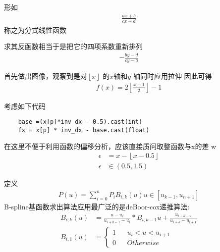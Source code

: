 \begin{thm}[分式线性函数]
形如
\begin{align}
		\frac{ax+b}{cx+d} 
\end{align}
称之为分式线性函数
\par 求其反函数相当于是把它的四项系数重新排列
\begin{align}
	-	\frac{by-d}{cy-a} 
\end{align}
\end{thm}
\begin{thm}
\end{thm}
\begin{thm}[求$x$左边最近的奇数]
首先做出图像，观察到是对$ \left\lfloor x \right\rfloor $ 的$x$轴和$ y $ 轴同时应用拉伸
因此可得
\begin{align*}
		f(x) = 2\left\lfloor \frac{x+1}{2}  \right\rfloor -1
\end{align*}
\end{thm}
\begin{thm}[取整函数分析]
	考虑如下代码	
	\begin{lstlisting}
	base =(x[p]*inv_dx - 0.5).cast(int)
	fx = x[p] * inv_dx - base.cast(float)
	\end{lstlisting}
	在这里不便于利用函数的偏移分析，应该直接质问取整函数与x的差 
	w\begin{align*}
			\epsilon  &= x- \left\lfloor x-0.5\right\rfloor \\
			\epsilon &\in \left( 0.5,1.5 \right) 
	\end{align*}	
\end{thm}
\begin{thm}
		定义
		\begin{align*}
				P\left( u \right) =\sum_{i=0}^{n} P_iB_{i,k}(u) 
				u \in \left[ u_{k-1},u_{n+1} \right] 
		\end{align*}
		B-spline基函数求出算法应用最广泛的是deBoor-cox递推算法:
		\begin{align*}
				B_{i,k}\left( u \right) &=\frac{u-u_i}{u_{i+k-1}-u_i} *B_{i,k-1}u+\frac{u_{i+k-u}}{u_{i+k}-u_{i+1}} \\
				B_{i,1}\left( u \right) &=\left\{\begin{aligned}
								1  && u_i<u<u_{i+1}\\
	0 && Otherwise
				\end{aligned}\right.
		\end{align*}
\end{thm}
\begin{thm}
\end{thm}
